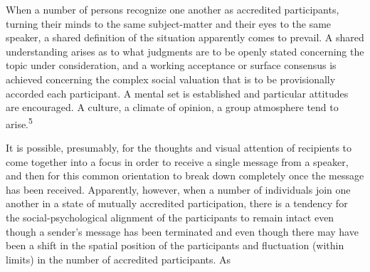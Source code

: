 \documentclass[openany,nobib]{tufte-book}
\begin{document}
When a number of persons recognize one another as accredited
participants, turning their minds to the same subject-matter and their
eyes to the same speaker, a shared definition of the situation
apparently comes to prevail. A shared understanding arises as to what
judgments are to be openly stated concerning the topic under
consideration, and a working acceptance or surface consensus is achieved
concerning the complex social valuation that is to be provisionally
accorded each participant. A mental set is established and particular
attitudes are encouraged. A culture, a climate of opinion, a group
atmosphere tend to arise.\textsuperscript{5}

It is possible, presumably, for the thoughts and visual attention of
recipients to come together into a focus in order to receive a single
message from a speaker, and then for this common orientation to break
down completely once the message has been received. Apparently, however,
when a number of individuals join one another in a state of mutually
accredited participation, there is a tendency for the
social-psychological alignment of the participants to remain intact even
though a sender's message has been terminated and even though there may
have been a shift in the spatial position of the participants and
fluctuation (within limits) in the number of accredited participants. As
\end{document}
